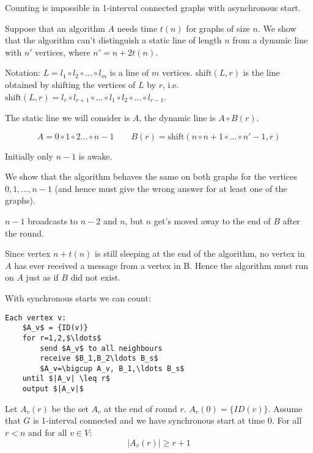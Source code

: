 \begin{thm} Counting is impossible in 1-interval connected graphs with asynchronous start.\end{thm}
\begin{pr} Suppose that an algorithm $A$ needs time $t(n)$ for graphs of size $n$. We show that the algorithm can't distinguish a static line of length $n$ from a dynamic line with $n'$ vertices, where $n'=n+2t(n)$.

Notation: $L=l_1\circ l_2\circ \ldots \circ l_m$ is a line of $m$ vertices. $\text{shift}(L,r)$ is the line obtained by shifting the vertices of $L$ by $r$, i.e. $\text{shift}(L,r) = l_r\circ l_{r+1} \circ \ldots \circ l_1 \circ l_2 \circ \ldots \circ l_{r-1}$.

The static line we will consider is $A$, the dynamic line is $A\circ B(r)$.

\[A = 0\circ 1 \circ 2\ldots \circ n-1 \qquad B(r) = \text{shift}(n\circ n+1\circ \ldots \circ n'-1,r)\]

Initially only $n-1$ is awake.

We show that the algorithm behaves the same on both graphs for the vertices $0,1,\ldots ,n-1$ (and hence must give the wrong answer for at least one of the graphs).


$n-1$ broadcasts to $n-2$ and $n$, but $n$ get's moved away to the end of $B$ after the round.

Since vertex $n+t(n)$ is still sleeping at the end of the algorithm, no vertex in $A$ has ever received a message from a vertex in B. Hence the algorithm must run on $A$ just as if $B$ did not exist.
\end{pr}

With synchronous starts we can count:

\begin{lstlisting}
Each vertex v:
	$A_v$ = {ID(v)}
	for r=1,2,$\ldots$
		send $A_v$ to all neighbours
		receive $B_1,B_2\ldots B_s$
		$A_v=\bigcup A_v, B_1,\ldots B_s$
	until $|A_v| \leq r$
	output $|A_v|$
\end{lstlisting}

\begin{lem} Let $A_v(r)$ be the set $A_v$ at the end of round $r$. $A_v(0)=\{ID(v)\}$. Assume that $G$ is 1-interval connected and we have synchronous start at time $0$. For all $r<n$ and for all $v\in V$:
\[|A_v(r)| \geq r+1\]
\end{lem}

